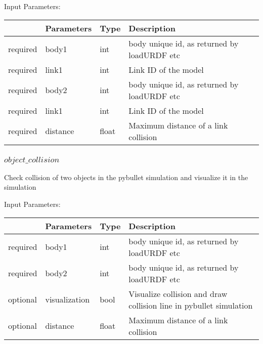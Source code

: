 \documentclass[
	ngerman,
	accentcolor=9c,%
	type=intern,
	marginpar=false
	]{tudapub}
\begin{document}
\vspace{0.5cm}
\noindent Input Parameters:
\vspace{0.5cm}

\begin{tabular}{|p{}|p{}|p{}| p{}|}
\hline
 & \textbf{Parameters} & \textbf{Type} & \textbf{Description} \\
\hline
required & body1 & int & body unique id, as returned by loadURDF etc\\
\hline
required & link1 &  int & Link ID of the model \\
\hline
required & body2 & int & body unique id, as returned by loadURDF etc\\
\hline
required & link1 &  int & Link ID of the model \\
\hline
required & distance &  float & Maximum distance of a link collision
\\
\hline
\end{tabular}
\vspace{0.5cm}





\subsubsection{$object\_collision$}
\noindent Check collision of two objects in the pybullet simulation and visualize it in the simulation



\vspace{0.5cm}
\noindent Input Parameters:
\vspace{0.5cm}

\begin{tabular}{|p{}|p{}|p{}| p{}|}
\hline
 & \textbf{Parameters} & \textbf{Type} & \textbf{Description} \\
\hline
required & body1 & int & body unique id, as returned by loadURDF etc\\
\hline
required & body2 & int & body unique id, as returned by loadURDF etc\\
\hline
optional & visualization &  bool & Visualize collision and draw collision line in pybullet simulation \\
\hline
optional & distance &  float & Maximum distance of a link collision
\\
\hline
\end{tabular}
\vspace{0.5cm}
\end{document}

